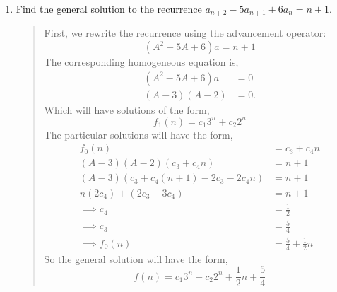 \documentclass[letter]{article}
\begin{document}
\begin{enumerate}
		\newpage
        \item 
        Find the general solution to the recurrence $a_{n+2} - 5a_{n+1} + 6a_n = n + 1$.
		\begin{quote}
		    First, we rewrite the recurrence using the advancement operator:
		    \[
		        (A^2 - 5A +6)a = n+1
		    \]
		    The corresponding homogeneous equation is,
		    \begin{align*}
		        (A^2 - 5A +6)a &= 0 \\
		        (A-3)(A-2) &= 0.
		    \end{align*}
		    Which will have solutions of the form,
		    \[
		        f_1(n) = c_1 3^n  + c_2 2^n
		    \]
		    The particular solutions will have the form,
		    \begin{align*}
		        f_0(n) &= c_3 +c_4 n \\
		        (A-3)(A-2)(c_3 + c_4n) &= n + 1 \\
		        (A-3)(c_3 + c_4(n+1)-2c_3 -2c_4n) &= n + 1 \\
		        n(2c_4) +(2c_3 -3c_4) &= n + 1 \\
		        \implies c_4 &= \frac{1}{2}\\
		        \implies c_3 &= \frac{5}{4} \\ 
		        \implies f_0(n) &= \frac{5}{4} + \frac{1}{2} n
		    \end{align*}
		    So the general solution will have the form,
		    \[
    		     f(n) = c_1 3^n + c_2 2^n +  \frac{1}{2} n +  \frac{5}{4}
		    \]
		    
		\end{quote}
		

\end{enumerate}
\end{document}
